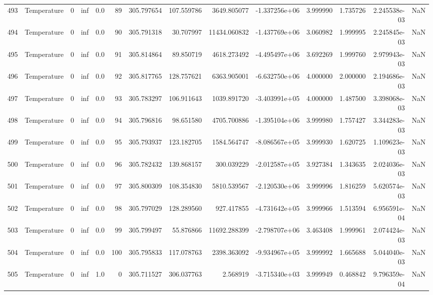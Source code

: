 \begin{tabular}{llrrrrrrrrrrrr}
493 &  Temperature &       0 &  inf &  0.0 &   89 &  305.797654 &   107.559786 &    3649.805077 & -1.337256e+06 &  3.999990 &  1.735726 &  2.245538e-03 &      NaN \\
494 &  Temperature &       0 &  inf &  0.0 &   90 &  305.791318 &    30.707997 &   11434.060832 & -1.437769e+06 &  3.060982 &  1.999995 &  2.245845e-03 &      NaN \\
495 &  Temperature &       0 &  inf &  0.0 &   91 &  305.814864 &    89.850719 &    4618.273492 & -4.495497e+06 &  3.692269 &  1.999760 &  2.979943e-03 &      NaN \\
496 &  Temperature &       0 &  inf &  0.0 &   92 &  305.817765 &   128.757621 &    6363.905001 & -6.632750e+06 &  4.000000 &  2.000000 &  2.194686e-03 &      NaN \\
497 &  Temperature &       0 &  inf &  0.0 &   93 &  305.783297 &   106.911643 &    1039.891720 & -3.403991e+05 &  4.000000 &  1.487500 &  3.398068e-03 &      NaN \\
498 &  Temperature &       0 &  inf &  0.0 &   94 &  305.796816 &    98.651580 &    4705.700886 & -1.395104e+06 &  3.999980 &  1.757427 &  3.344283e-03 &      NaN \\
499 &  Temperature &       0 &  inf &  0.0 &   95 &  305.793937 &   123.182705 &    1584.564747 & -8.086567e+05 &  3.999930 &  1.620725 &  1.109623e-03 &      NaN \\
500 &  Temperature &       0 &  inf &  0.0 &   96 &  305.782432 &   139.868157 &     300.039229 & -2.012587e+05 &  3.927384 &  1.343635 &  2.024036e-03 &      NaN \\
501 &  Temperature &       0 &  inf &  0.0 &   97 &  305.800309 &   108.354830 &    5810.539567 & -2.120530e+06 &  3.999996 &  1.816259 &  5.620574e-03 &      NaN \\
502 &  Temperature &       0 &  inf &  0.0 &   98 &  305.797029 &   128.289560 &     927.417855 & -4.731642e+05 &  3.999966 &  1.513594 &  6.956591e-04 &      NaN \\
503 &  Temperature &       0 &  inf &  0.0 &   99 &  305.799497 &    55.876866 &   11692.288399 & -2.798707e+06 &  3.463408 &  1.999961 &  2.074424e-03 &      NaN \\
504 &  Temperature &       0 &  inf &  0.0 &  100 &  305.795833 &   117.078763 &    2398.363092 & -9.934967e+05 &  3.999992 &  1.665688 &  5.044040e-03 &      NaN \\
505 &  Temperature &       0 &  inf &  1.0 &    0 &  305.711527 &   306.037763 &       2.568919 & -3.715340e+03 &  3.999949 &  0.468842 &  9.796359e-04 &      NaN \\

\end{tabular}
